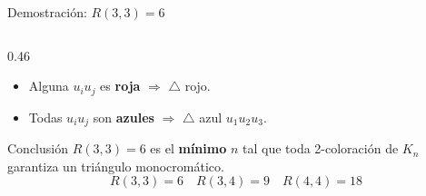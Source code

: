 \begin{frame}{Demostración: $R(3,3) = 6$}
\begin{columns}[T]
\begin{column}{0.46\textwidth}
            \vspace{0.5cm}

            \begin{itemize}
                \item[\textbf{(I)}] Alguna $u_iu_j$ es
                      \textcolor{red!80!black}{\textbf{roja}}
                      $\Rightarrow$ $\triangle$ rojo. \checkmark
                \item[\textbf{(II)}] Todas $u_iu_j$ son
                      \textcolor{blue!80!black}{\textbf{azules}}
                      $\Rightarrow$ $\triangle$ azul $u_1u_2u_3$. \checkmark
            \end{itemize}

            \pause
            \vspace{0.4cm}

            \begin{block}{Conclusión}
                $R(3,3) = 6$ es el \textbf{mínimo} $n$ tal que
                toda 2-coloración de $K_n$ garantiza un triángulo
                monocromático.
                \[
                    R(3,3)=6 \quad R(3,4)=9 \quad R(4,4)=18
                \]
            \end{block}
        \end{column}

    \end{columns}

\end{frame}

